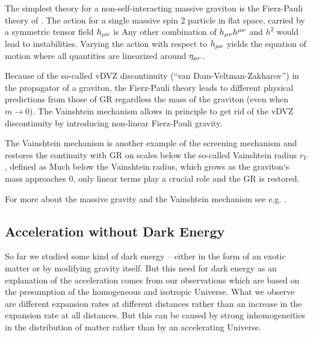The simplest theory for a non-self-interacting massive graviton is the Fierz-Pauli theory of \textcite{1939RSPSA.173..211F}. The action for a single massive spin 2 particle in flat space, carried by a symmetric tensor field $h_{\mu\nu}$ is
Any other combination of $h_{\mu\nu} h^{\mu\nu}$ and $h^2$ would lead to instabilities. Varying the action with respect to $h_{\mu\nu}$ yields the equation of motion
where all quantities are linearized around $\eta_{\mu\nu}$.

Because of the so-called vDVZ discontinuity (``van Dam-Veltman-Zakharov'') in the propagator of a graviton, the Fierz-Pauli theory leads to different physical predictions from those of GR regardless the mass of the graviton (even when $m\to0$). The Vainshtein mechanism \parencite{1972PhLB...39..393V} allows in principle to get rid of the vDVZ discontinuity by introducing non-linear Fierz-Pauli gravity.

The Vainshtein mechanism is another example of the screening mechanism and restores the continuity with GR on scales below the so-called Vainshtein radius $r_V$, defined as
Much below the Vainshtein radius, which grows as the graviton`s mass approaches $0$, only linear terms play a crucial role and the GR is restored.

For more about the massive gravity and the Vainshtein mechanism see e.g. \textcite{2013CQGra..30r4001B,2012RvMP...84..671H}.

\subsection{Acceleration without Dark Energy}
So far we studied some kind of dark energy -- either in the form of an exotic matter or by modifying gravity itself. But this need for dark energy as an explanation of the acceleration comes from our observations which are based on the presumption of the homogeneous and isotropic Universe. What we observe are different expansion rates at different distances rather than an increase in the expansion rate at all distances. But this can be caused by strong inhomogeneities in the distribution of matter rather than by an accelerating Universe.
